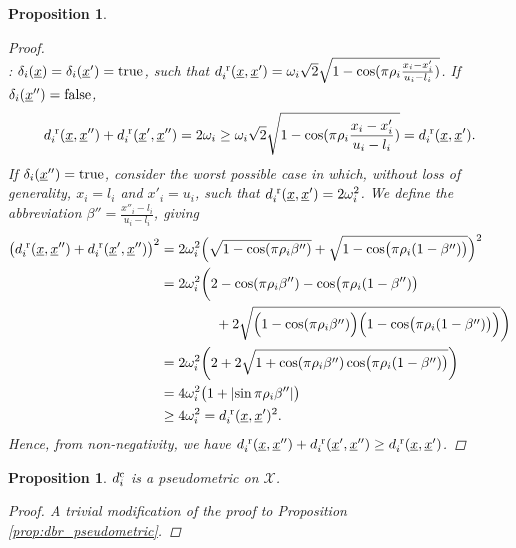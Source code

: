 \documentclass[letterpaper]{article}
\newcommand{\vect}[1]{\underline{\smash{#1}}}
\renewcommand{\v}[1]{\vect{#1}}
\newcommand{\sX}{\mathcal{X}}
\newcommand{\br}{^{\text{\textnormal{ r}}}}
\newcommand{\cat}{^{\text{\textnormal{c}}}}
\newtheorem{prop}[thm]{Proposition}
\begin{document}
\begin{prop}
\begin{proof}
~\\: $\delta_i(\v{x}) = \delta_i(\v{x}')=\textrm{true}$, such that  $d\br_i(\v{x},\v{x}') = \omega_i \sqrt{2} \sqrt{1 - \cos(\pi\rho_i \frac{x_i-x_i'}{u_i-l_i})}$.  If  $\delta_i(\v{x}'') = \text{false}$,
\begin{align}
d\br_i(\v{x},\v{x}'') + d\br_i(\v{x}',\v{x}'') = 2 \omega_i \geq \omega_i \sqrt{2} \sqrt{1 - \cos(\pi\rho_i \frac{x_i-x_i'}{u_i-l_i})} = d\br_i(\v{x},\v{x}').
\end{align} 
If  $\delta_i(\v{x}'') = \text{true}$, consider the worst possible case in which, without loss of generality, $x_i=l_i$ and $x'_i=u_i$, such that $d\br_i(\v{x},\v{x}')=2 \omega_i^2$.  We define the abbreviation $\beta'' = \frac{x''_i-l_i}{u_i-l_i}$, giving
\begin{align}
\bigl(d\br_i(\v{x},\v{x}'') + d\br_i(\v{x}',\v{x}'')\bigr)^2
& = 2\omega_i^2 \Bigl(\sqrt{1 - \cos (\pi\rho_i \beta'')} + \sqrt{1 - \cos \bigl(\pi\rho_i (1-\beta'')\bigr)}\Bigr)^2\nonumber\\
&=2\omega_i^2\biggl(2 - \cos (\pi\rho_i \beta'') - \cos \bigl(\pi\rho_i (1-\beta'')\bigr)
\nonumber\\
&\qquad\qquad+2\sqrt{\Bigl(1 - \cos (\pi\rho_i \beta'')\Bigr)\Bigl(1 - \cos \bigl(\pi\rho_i (1-\beta'')\bigr)\Bigr)}\biggr)\nonumber\\
&=2\omega_i^2\biggl(2 +2\sqrt{1 + \cos (\pi\rho_i \beta'')\cos \bigl(\pi\rho_i (1-\beta'')\bigr)}\biggr)\nonumber\\
&=4 \omega_i^2 \bigl(1 + \left|\sin \pi\rho_i \beta'' \right|\bigr)\nonumber\\
&\geq 4 \omega_i^2 = d\br_i(\v{x},\v{x}')^2.
\end{align}
Hence, from non-negativity, we have $d\br_i(\v{x},\v{x}'') + d\br_i(\v{x}',\v{x}'')\geq d\br_i(\v{x},\v{x}')$.
\end{proof}
\end{prop}

\begin{prop}
 $d\cat_i$ is a pseudometric on $\sX$.\label{prop:dbr_pseudometric_cat}
 \begin{proof}
 A trivial modification of the proof to Proposition \ref{prop:dbr_pseudometric}.
 \end{proof}
\end{prop}


%
\end{document}
